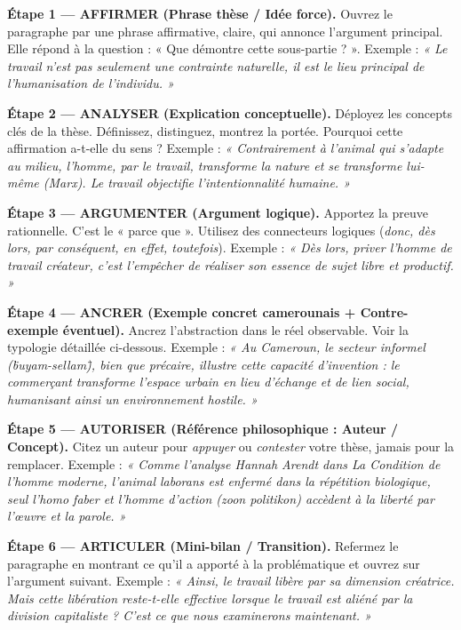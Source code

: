 \documentclass[11pt]{article}
\begin{document}
\begin{methode}
\textbf{Étape 1 — AFFIRMER (Phrase thèse / Idée force).} Ouvrez le paragraphe par une phrase affirmative, claire, qui annonce l'argument principal. Elle répond à la question : « Que démontre cette sous-partie ? ». Exemple : \emph{« Le travail n'est pas seulement une contrainte naturelle, il est le lieu principal de l'humanisation de l'individu. »}

\textbf{Étape 2 — ANALYSER (Explication conceptuelle).} Déployez les concepts clés de la thèse. Définissez, distinguez, montrez la portée. Pourquoi cette affirmation a-t-elle du sens ? Exemple : \emph{« Contrairement à l'animal qui s'adapte au milieu, l'homme, par le travail, transforme la nature et se transforme lui-même (Marx). Le travail objectifie l'intentionnalité humaine. »}

\textbf{Étape 3 — ARGUMENTER (Argument logique).} Apportez la preuve rationnelle. C'est le « parce que ». Utilisez des connecteurs logiques (\emph{donc, dès lors, par conséquent, en effet, toutefois}). Exemple : \emph{« Dès lors, priver l'homme de travail créateur, c'est l'empêcher de réaliser son essence de sujet libre et productif. »}

\textbf{Étape 4 — ANCRER (Exemple concret camerounais + Contre-exemple éventuel).} Ancrez l'abstraction dans le réel observable. Voir la typologie détaillée ci-dessous. Exemple : \emph{« Au Cameroun, le secteur informel (\"buyam-sellam\"), bien que précaire, illustre cette capacité d'invention : le commerçant transforme l'espace urbain en lieu d'échange et de lien social, humanisant ainsi un environnement hostile. »}

\textbf{Étape 5 — AUTORISER (Référence philosophique : Auteur / Concept).} Citez un auteur pour \emph{appuyer} ou \emph{contester} votre thèse, jamais pour la remplacer. Exemple : \emph{« Comme l'analyse Hannah Arendt dans \textit{La Condition de l'homme moderne}, l'\textit{animal laborans} est enfermé dans la répétition biologique, seul l'\textit{homo faber} et l'homme d'action (\textit{zoon politikon}) accèdent à la liberté par l'œuvre et la parole. »}

\textbf{Étape 6 — ARTICULER (Mini-bilan / Transition).} Refermez le paragraphe en montrant ce qu'il a apporté à la problématique et ouvrez sur l'argument suivant. Exemple : \emph{« Ainsi, le travail libère par sa dimension créatrice. Mais cette libération reste-t-elle effective lorsque le travail est aliéné par la division capitaliste ? C'est ce que nous examinerons maintenant. »}
\end{methode}
\end{document}
